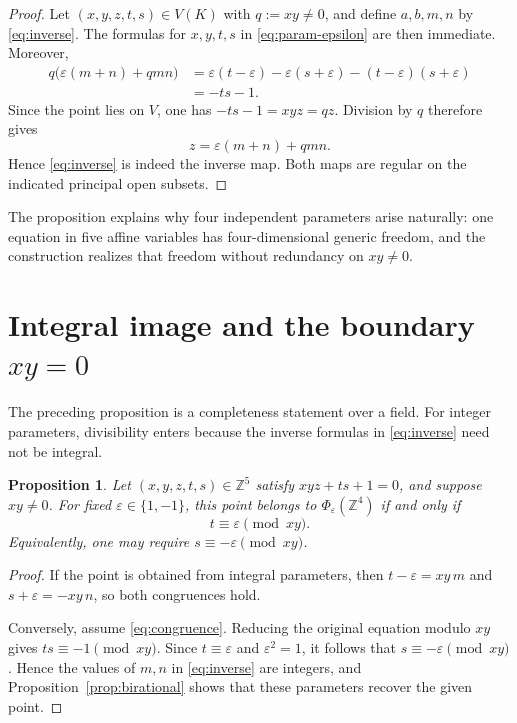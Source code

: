 \documentclass[11pt]{article}
\newtheorem{proposition}[theorem]{Proposition}
\theoremstyle{remark}
\newcommand{\Z}{\mathbb Z}
\begin{document}
\begin{proof}
Let \((x,y,z,t,s)\in V(K)\) with \(q:=xy\neq0\), and define
\(a,b,m,n\) by \eqref{eq:inverse}.  The formulas for \(x,y,t,s\) in
\eqref{eq:param-epsilon} are then immediate.  Moreover,
\begin{align*}
q\bigl(\varepsilon(m+n)+qmn\bigr)
&=\varepsilon(t-\varepsilon)-\varepsilon(s+\varepsilon)
  -(t-\varepsilon)(s+\varepsilon)\\
&=-ts-1.
\end{align*}
Since the point lies on \(V\), one has \(-ts-1=xyz=qz\).  Division by
\(q\) therefore gives
\[
z=\varepsilon(m+n)+qmn.
\]
Hence \eqref{eq:inverse} is indeed the inverse map.  Both maps are regular on
the indicated principal open subsets.
\end{proof}

The proposition explains why four independent parameters arise naturally:
one equation in five affine variables has four-dimensional generic freedom,
and the construction realizes that freedom without redundancy on
\(xy\neq0\).

\section{Integral image and the boundary
\texorpdfstring{\(xy=0\)}{xy=0}}

The preceding proposition is a completeness statement over a field.  For
integer parameters, divisibility enters because the inverse formulas in
\eqref{eq:inverse} need not be integral.

\begin{proposition}\label{prop:integer-image}
Let \((x,y,z,t,s)\in\Z^5\) satisfy \(xyz+ts+1=0\), and suppose \(xy\neq0\).
For fixed \(\varepsilon\in\{1,-1\}\), this point belongs to
\(\Phi_\varepsilon(\Z^4)\) if and only if
\begin{equation}\label{eq:congruence}
 t\equiv\varepsilon\pmod{xy}.
\end{equation}
Equivalently, one may require \(s\equiv-\varepsilon\pmod{xy}\).
\end{proposition}

\begin{proof}
If the point is obtained from integral parameters, then
\(t-\varepsilon=xy\,m\) and \(s+\varepsilon=-xy\,n\), so both congruences
hold.

Conversely, assume \eqref{eq:congruence}.  Reducing the original equation
modulo \(xy\) gives \(ts\equiv-1\pmod{xy}\).  Since
\(t\equiv\varepsilon\) and \(\varepsilon^2=1\), it follows that
\(s\equiv-\varepsilon\pmod{xy}\).  Hence the values of \(m,n\) in
\eqref{eq:inverse} are integers, and Proposition~\ref{prop:birational} shows
that these parameters recover the given point.
\end{proof}
\end{document}
